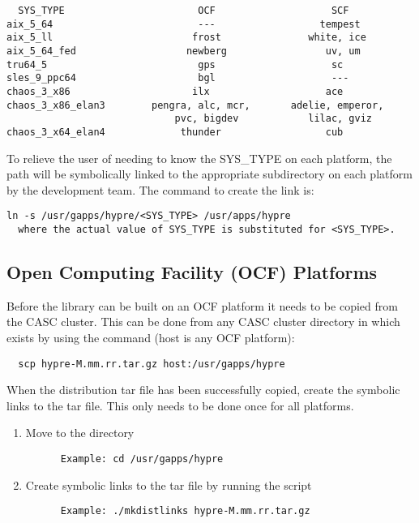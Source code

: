 \begin{verbatim}
  SYS_TYPE                       OCF                    SCF
aix_5_64                         ---                  tempest
aix_5_ll                        frost               white, ice
aix_5_64_fed                   newberg                 uv, um
tru64_5                          gps                    sc
sles_9_ppc64                     bgl                    ---
chaos_3_x86                     ilx                    ace
chaos_3_x86_elan3        pengra, alc, mcr,       adelie, emperor,
                             pvc, bigdev            lilac, gviz
chaos_3_x64_elan4             thunder                  cub
\end{verbatim}

To relieve the user of needing to know the SYS\_TYPE on each platform, the path
 will be symbolically linked to the appropriate subdirectory
on each platform by the development team.  The command to create the link is:
\begin{verbatim}
ln -s /usr/gapps/hypre/<SYS_TYPE> /usr/apps/hypre
  where the actual value of SYS_TYPE is substituted for <SYS_TYPE>.
\end{verbatim}

\subsection{Open Computing Facility (OCF) Platforms}
\label{Open Computing Facility (OCF) Platforms}

Before the \hypre{} library can be built on an OCF platform it needs to be 
copied from the CASC cluster.  This can be done from any CASC cluster directory
in which  exists by using the command (host is any OCF
platform):
\begin{verbatim}
  scp hypre-M.mm.rr.tar.gz host:/usr/gapps/hypre
\end{verbatim}

When the distribution tar file has been successfully copied, create the symbolic
links to the tar file. This only needs to be done once for all platforms.

\begin{enumerate}
\item Move to the  directory
\begin{verbatim}
      Example: cd /usr/gapps/hypre
\end{verbatim}
\item Create symbolic links to the tar file by running the  script
\begin{verbatim}
      Example: ./mkdistlinks hypre-M.mm.rr.tar.gz
\end{verbatim}
\end{enumerate}

